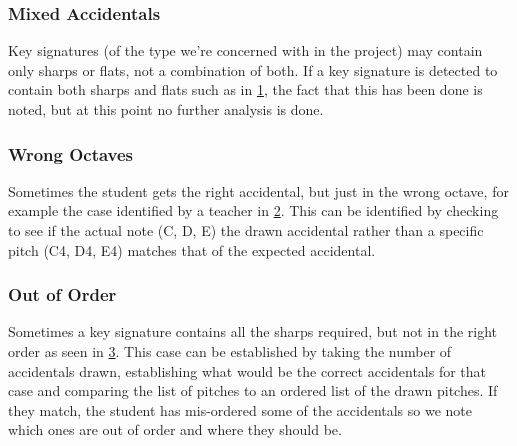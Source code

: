 \subsubsection{Mixed Accidentals}

Key signatures (of the type we're concerned with in the project) may contain only sharps or flats, not a combination of both. If a key signature is detected to contain both sharps and flats such as in \cref{fig:mixed-accidentals-bad}, the fact that this has been done is noted, but at this point no further analysis is done.

\begin{figure}[H]
  \caption{}
  \label{fig:mixed-accidentals-bad}
\end{figure}

\subsubsection{Wrong Octaves}

Sometimes the student gets the right accidental, but just in the wrong octave, for example the case identified by a teacher in \cref{fig:right-accidental-wrong-octave}. This can be identified by checking to see if the actual note (C, D, E) the drawn accidental rather than a specific pitch (C4, D4, E4) matches that of the expected accidental.

\begin{figure}[H]
  \caption{}
  \label{fig:right-accidental-wrong-octave}
\end{figure}

\subsubsection{Out of Order}

Sometimes a key signature contains all the sharps required, but not in the right order as seen in \cref{fig:right-accidentals-wrong-ordering}. This case can be established by taking the number of accidentals drawn, establishing what would be the correct accidentals for that case and comparing the list of pitches to an ordered list of the drawn pitches. If they match, the student has mis-ordered some of the accidentals so we note which ones are out of order and where they should be.

\begin{figure}[H]
  \caption{}
  \label{fig:right-accidentals-wrong-ordering}
\end{figure}


